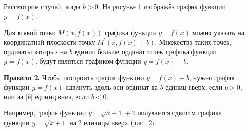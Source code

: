 
Рассмотрим случай, когда $b > 0$.
На рисунке \ref{fig_1_10_22} изображён график функции $y = f(x)$.

\begin{figure}\label{fig_1_10_22}
\end{figure}

Для всякой точки $M(x, f(x))$ графика функции $y = f(x)$ можно указать
на координатной плоскости точку $M^{\prime}(x, f(x) + b)$.
Множество таких точек, ординаты которых на $b$ единиц больше ординат
точек графика функции $y = f(x)$, будут являться графиком функции
$y = f(x) + b$.

\textbf{Правило 2.} Чтобы построить график функции $y = f(x) + b$,
нужно график функции $y = f(x)$ сдвинуть вдоль оси ординат на $b$
единиц вверх, если $b > 0$, или на $|b|$ единиц вниз, если $b < 0$.

Например, график функции $y = \sqrt{x + 1} + 2$ получается сдвигом
графика функции $y = \sqrt{x + 1}$ на 2 единицы вверх (рис.\ \ref{fig_1_10_23}).

\begin{figure}\label{fig_1_10_23}
\end{figure}

